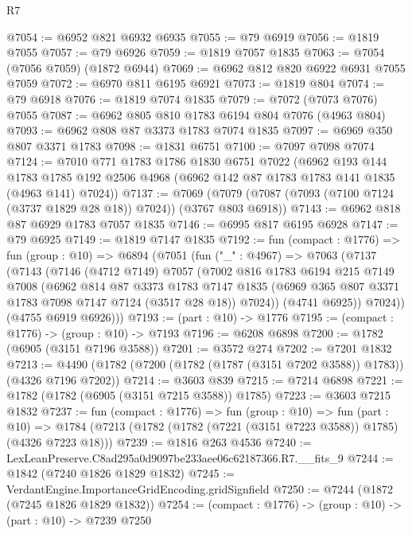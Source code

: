 \begin{lexlean}{R7}
\begin{coremodule}
@7054 := @6952 @821 @6932 @6935
@7055 := @79 @6919
@7056 := @1819 @7055
@7057 := @79 @6926
@7059 := @1819 @7057 @1835
@7063 := @7054 (@7056 @7059) (@1872 @6944)
@7069 := @6962 @812 @820 @6922 @6931 @7055 @7059
@7072 := @6970 @811 @6195 @6921
@7073 := @1819 @804
@7074 := @79 @6918
@7076 := @1819 @7074 @1835
@7079 := @7072 (@7073 @7076) @7055
@7087 := @6962 @805 @810 @1783 @6194 @804 @7076 (@4963 @804)
@7093 := @6962 @808 @87 @3373 @1783 @7074 @1835
@7097 := @6969 @350 @807 @3371 @1783
@7098 := @1831 @6751
@7100 := @7097 @7098 @7074
@7124 := @7010
    @771
    @1783
    @1786
    @1830
    @6751
    @7022
    (@6962
      @193
      @144
      @1783
      @1785
      @192
      @2506
      @4968
      (@6962 @142 @87 @1783 @1783 @141 @1835 (@4963 @141) @7024))
@7137 := @7069 (@7079 (@7087 (@7093 (@7100 @7124 (@3737 @1829 @28 @18)) @7024)) (@3767 @803 @6918))
@7143 := @6962 @818 @87 @6929 @1783 @7057 @1835
@7146 := @6995 @817 @6195 @6928
@7147 := @79 @6925
@7149 := @1819 @7147 @1835
@7192 := fun (compact : @1776) =>
  fun (group : @10) =>
  @6894
    (@7051
      (fun ("_" : @4967) =>
      @7063
        (@7137
          (@7143
            (@7146
              (@4712 @7149)
              @7057
              (@7002
                @816
                @1783
                @6194
                @215
                @7149
                @7008
                (@6962
                  @814
                  @87
                  @3373
                  @1783
                  @7147
                  @1835
                  (@6969 @365 @807 @3371 @1783 @7098 @7147 @7124 (@3517 @28 @18))
                  @7024))
              (@4741 @6925))
            @7024))
        (@4755 @6919 @6926)))
@7193 := (part : @10) -> @1776
@7195 := (compact : @1776) -> (group : @10) -> @7193
@7196 := @6208 @6898
@7200 := @1782 (@6905 (@3151 @7196 @3588))
@7201 := @3572 @274
@7202 := @7201 @1832
@7213 := @4490 (@1782 (@7200 (@1782 (@1787 (@3151 @7202 @3588)) @1783)) (@4326 @7196 @7202))
@7214 := @3603 @839
@7215 := @7214 @6898
@7221 := @1782 (@1782 (@6905 (@3151 @7215 @3588)) @1785)
@7223 := @3603 @7215 @1832
@7237 := fun (compact : @1776) =>
  fun (group : @10) =>
  fun (part : @10) =>
  @1784 (@7213 (@1782 (@1782 (@7221 (@3151 @7223 @3588)) @1785) (@4326 @7223 @18)))
@7239 := @1816 @263 @4536
@7240 := LexLeanPreserve.C8ad295a0d9097be233aee06c62187366.R7.__fits_9
@7244 := @1842 (@7240 @1826 @1829 @1832)
@7245 := VerdantEngine.ImportanceGridEncoding.gridSignfield
@7250 := @7244 (@1872 (@7245 @1826 @1829 @1832))
@7254 := (compact : @1776) -> (group : @10) -> (part : @10) -> @7239 @7250

\end{coremodule}
\end{lexlean}
